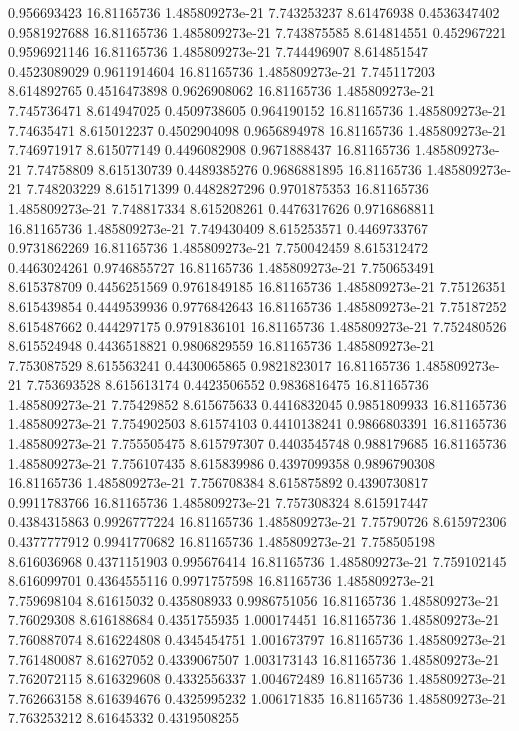 {0.956693423 16.81165736 1.485809273e-21 7.743253237 8.61476938 0.4536347402
0.9581927688 16.81165736 1.485809273e-21 7.743875585 8.614814551 0.452967221
0.9596921146 16.81165736 1.485809273e-21 7.744496907 8.614851547 0.4523089029
0.9611914604 16.81165736 1.485809273e-21 7.745117203 8.614892765 0.4516473898
0.9626908062 16.81165736 1.485809273e-21 7.745736471 8.614947025 0.4509738605
0.964190152 16.81165736 1.485809273e-21 7.74635471 8.615012237 0.4502904098
0.9656894978 16.81165736 1.485809273e-21 7.746971917 8.615077149 0.4496082908
0.9671888437 16.81165736 1.485809273e-21 7.74758809 8.615130739 0.4489385276
0.9686881895 16.81165736 1.485809273e-21 7.748203229 8.615171399 0.4482827296
0.9701875353 16.81165736 1.485809273e-21 7.748817334 8.615208261 0.4476317626
0.9716868811 16.81165736 1.485809273e-21 7.749430409 8.615253571 0.4469733767
0.9731862269 16.81165736 1.485809273e-21 7.750042459 8.615312472 0.4463024261
0.9746855727 16.81165736 1.485809273e-21 7.750653491 8.615378709 0.4456251569
0.9761849185 16.81165736 1.485809273e-21 7.75126351 8.615439854 0.4449539936
0.9776842643 16.81165736 1.485809273e-21 7.75187252 8.615487662 0.444297175
0.9791836101 16.81165736 1.485809273e-21 7.752480526 8.615524948 0.4436518821
0.9806829559 16.81165736 1.485809273e-21 7.753087529 8.615563241 0.4430065865
0.9821823017 16.81165736 1.485809273e-21 7.753693528 8.615613174 0.4423506552
0.9836816475 16.81165736 1.485809273e-21 7.75429852 8.615675633 0.4416832045
0.9851809933 16.81165736 1.485809273e-21 7.754902503 8.61574103 0.4410138241
0.9866803391 16.81165736 1.485809273e-21 7.755505475 8.615797307 0.4403545748
0.988179685 16.81165736 1.485809273e-21 7.756107435 8.615839986 0.4397099358
0.9896790308 16.81165736 1.485809273e-21 7.756708384 8.615875892 0.4390730817
0.9911783766 16.81165736 1.485809273e-21 7.757308324 8.615917447 0.4384315863
0.9926777224 16.81165736 1.485809273e-21 7.75790726 8.615972306 0.4377777912
0.9941770682 16.81165736 1.485809273e-21 7.758505198 8.616036968 0.4371151903
0.995676414 16.81165736 1.485809273e-21 7.759102145 8.616099701 0.4364555116
0.9971757598 16.81165736 1.485809273e-21 7.759698104 8.61615032 0.435808933
0.9986751056 16.81165736 1.485809273e-21 7.76029308 8.616188684 0.4351755935
1.000174451 16.81165736 1.485809273e-21 7.760887074 8.616224808 0.4345454751
1.001673797 16.81165736 1.485809273e-21 7.761480087 8.61627052 0.4339067507
1.003173143 16.81165736 1.485809273e-21 7.762072115 8.616329608 0.4332556337
1.004672489 16.81165736 1.485809273e-21 7.762663158 8.616394676 0.4325995232
1.006171835 16.81165736 1.485809273e-21 7.763253212 8.61645332 0.4319508255
}
